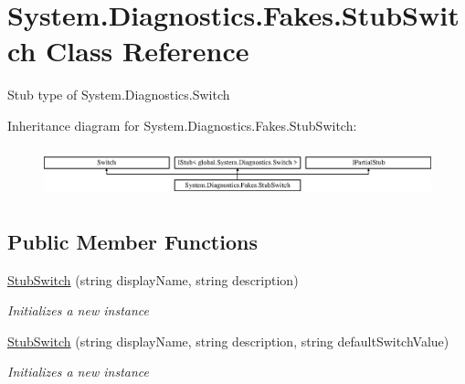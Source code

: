 \hypertarget{class_system_1_1_diagnostics_1_1_fakes_1_1_stub_switch}{\section{System.\-Diagnostics.\-Fakes.\-Stub\-Switch Class Reference}
\label{class_system_1_1_diagnostics_1_1_fakes_1_1_stub_switch}
}


Stub type of System.\-Diagnostics.\-Switch 


Inheritance diagram for System.\-Diagnostics.\-Fakes.\-Stub\-Switch\-:\begin{figure}[H]
\begin{center}
\leavevmode
\includegraphics[height=1.435897cm]{class_system_1_1_diagnostics_1_1_fakes_1_1_stub_switch}
\end{center}
\end{figure}
\subsection*{Public Member Functions}
\begin{DoxyCompactItemize}
\item 
\hyperlink{class_system_1_1_diagnostics_1_1_fakes_1_1_stub_switch_ae3755a137d425eb652efeae339eaff04}{Stub\-Switch} (string display\-Name, string description)
\begin{DoxyCompactList}\small\item\em Initializes a new instance\end{DoxyCompactList}\item 
\hyperlink{class_system_1_1_diagnostics_1_1_fakes_1_1_stub_switch_ae523fb3adf6468e392a1e72f435d3560}{Stub\-Switch} (string display\-Name, string description, string default\-Switch\-Value)
\begin{DoxyCompactList}\small\item\em Initializes a new instance\end{DoxyCompactList}\end{DoxyCompactItemize}
